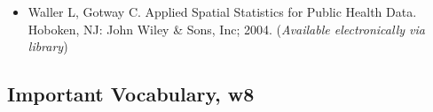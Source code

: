 \documentclass[
]{book}
\providecommand{\tightlist}{%
  \setlength{\itemsep}{0pt}\setlength{\parskip}{0pt}}
\begin{document}
\begin{itemize}
\tightlist
\item
  Waller L, Gotway C. Applied Spatial Statistics for Public Health Data. Hoboken, NJ: John Wiley \& Sons, Inc; 2004. (\emph{Available electronically via library})
\end{itemize}

\hypertarget{important-vocabulary-w8}{%
\subsection{Important Vocabulary, w8}\label{important-vocabulary-w8}}

 
  \providecommand{\huxb}[2]{\arrayrulecolor[RGB]{#1}\global\arrayrulewidth=#2pt}
  \providecommand{\huxvb}[2]{\color[RGB]{#1}\vrule width #2pt}
  \providecommand{\huxtpad}[1]{\rule{0pt}{#1}}
  \providecommand{\huxbpad}[1]{\rule[-#1]{0pt}{#1}}
\end{document}
